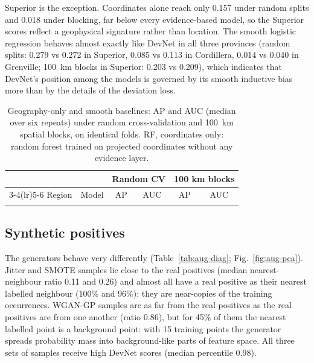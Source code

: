 \documentclass[pdflatex,sn-apa]{sn-jnl}
\begin{document}
Superior is the exception. Coordinates alone reach only 0.157 under random splits and 0.018 under blocking, far below every evidence-based model, so the Superior scores reflect a geophysical signature rather than location. The smooth logistic regression behaves almost exactly like DevNet in all three provinces (random splits: 0.279 vs 0.272 in Superior, 0.085 vs 0.113 in Cordillera, 0.014 vs 0.040 in Grenville; 100~km blocks in Superior: 0.203 vs 0.209), which indicates that DevNet's position among the models is governed by its smooth inductive bias more than by the details of the deviation loss.

\begin{table}[t]
\caption{Geography-only and smooth baselines: AP and AUC (median over six repeats) under random cross-validation and 100~km spatial blocks, on identical folds. RF, coordinates only: random forest trained on projected coordinates without any evidence layer.}\label{tab:geography}
\footnotesize
\setlength{\tabcolsep}{3pt}
\begin{tabular*}{\textwidth}{@{\extracolsep\fill}llcccc}
\toprule
 & & \multicolumn{2}{c}{Random CV} & \multicolumn{2}{c}{100 km blocks} \\
\cmidrule(lr){3-4}\cmidrule(lr){5-6}
Region & Model & AP & AUC & AP & AUC \\
\midrule
\botrule
\end{tabular*}
\end{table}

\subsection{Synthetic positives}\label{sec:res-augmentation}

The generators behave very differently (Table~\ref{tab:aug-diag}; Fig.~\ref{fig:aug-pca}). Jitter and SMOTE samples lie close to the real positives (median nearest-neighbour ratio 0.11 and 0.26) and almost all have a real positive as their nearest labelled neighbour (100\% and 96\%): they are near-copies of the training occurrences. WGAN-GP samples are as far from the real positives as the real positives are from one another (ratio 0.86), but for 45\% of them the nearest labelled point is a background point: with 15 training points the generator spreads probability mass into background-like parts of feature space. All three sets of samples receive high DevNet scores (median percentile 0.98).
\end{document}
